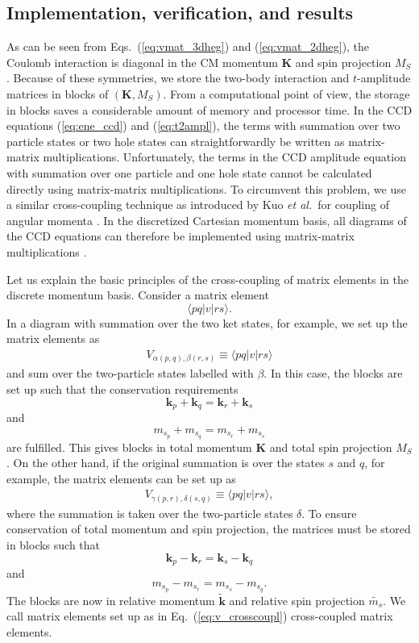 \documentclass[a4paper,12pt]{report}
\begin{document}
\subsection{Implementation, verification, and results}

As can be seen from Eqs.~(\ref{eq:vmat_3dheg}) and 
(\ref{eq:vmat_2dheg}), the Coulomb interaction is diagonal 
in the CM momentum $\mathbf{K}$ and spin projection $M_{S}$. 
Because of these symmetries, we store the two-body 
interaction and $t$-amplitude matrices in blocks of 
$(\mathbf{K}, M_{S})$. From a computational point of view,
the storage in blocks saves a considerable amount of 
memory and processor time. In the CCD equations 
(\ref{eq:ene_ccd}) and (\ref{eq:t2ampl}), the terms with
summation over two particle states or two hole states
can straightforwardly be written as matrix-matrix 
multiplications. Unfortunately, the terms in the 
CCD amplitude equation with summation over one particle 
and one hole state cannot be calculated directly using 
matrix-matrix multiplications. To circumvent this 
problem, we use a similar cross-coupling technique as
introduced by Kuo \emph{et al.}~for 
coupling of angular momenta \cite{kuo1981}. In the discretized 
Cartesian momentum basis, all diagrams of the CCD 
equations can therefore be implemented using matrix-matrix 
multiplications \cite{hagen2014}. 

Let us explain the basic principles of the cross-coupling
of matrix elements in the discrete momentum basis. 
Consider a matrix element
\[
\langle pq|v|rs\rangle .
\] 
In a diagram with summation over the two ket 
states, for example, we set up the matrix elements as 
\begin{align}
  V_{\alpha(p, q) , \beta(r, s) } \equiv 
  \langle pq|v|rs\rangle \nonumber
\end{align}
and sum over the two-particle states labelled with 
$\beta $. In this case, the blocks are set up such that
the conservation requirements
\[
\mathbf{k}_{p}+\mathbf{k}_{q} = \mathbf{k}_{r}+\mathbf{k}_{s} 
\]
and 
\[
m_{s_{p}}+m_{s_{q}} = m_{s_{r}}+m_{s_{s}} 
\]
are fulfilled. This gives blocks in total momentum 
$\mathbf{K}$ and total spin projection $M_{S}$. On the other 
hand, if the original summation is over the states $s$ and 
$q$, for example, the matrix elements can be set up as
\begin{align} \label{eq:v_crosscoupl}
  V_{\gamma(p, r), \delta(s, q)} \equiv
  \langle pq|v|rs\rangle ,
\end{align} 
where the summation is taken over the two-particle states 
$\delta $. To ensure conservation of total momentum and 
spin projection, the matrices must be stored in blocks such 
that
\[
\mathbf{k}_{p}-\mathbf{k}_{r} = \mathbf{k}_{s}-\mathbf{k}_{q} 
\]
and
\[
m_{s_{p}}-m_{s_{r}} = m_{s_{s}}-m_{s_{q}}.
\]
The blocks are now in relative momentum $\mathbf{\tilde{k}}$ and 
relative spin projection $\tilde{m_{s}}$. We call matrix 
elements set up as in Eq.~(\ref{eq:v_crosscoupl}) 
cross-coupled matrix elements.
\end{document}
